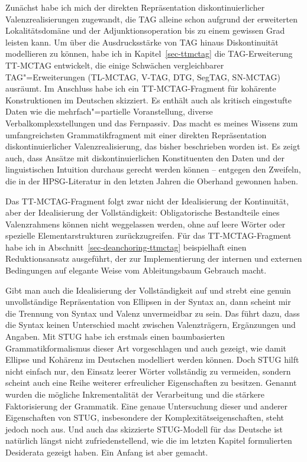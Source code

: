 Zunächst habe ich mich der direkten Repräsentation diskontinuierlicher Valenzrealisierungen zugewandt, die TAG alleine schon aufgrund der erweiterten Lokalitätsdomäne und der Adjunktionsoperation bis zu einem gewissen Grad leisten kann. Um über die Ausdrucksstärke von TAG hinaus Diskontinuität modellieren zu können, habe ich in Kapitel~\ref{sec-ttmctag} die TAG-Erweiterung TT-MCTAG entwickelt, die einige Schwächen vergleichbarer TAG"=Erweiterungen (TL-MCTAG, V-TAG, DTG, SegTAG, SN-MCTAG) ausräumt. Im Anschluss habe ich ein TT-MCTAG-Fragment für kohärente Konstruktionen im Deutschen skizziert. Es enthält auch als kritisch eingestufte Daten wie die mehrfach"=partielle Voranstellung, diverse Verbalkomplexstellungen und das Fernpassiv. Das macht es meines Wissens zum  umfangreichsten Grammatikfragment mit einer direkten Repräsentation diskontinuierlicher Valenzrealisierung, das bisher beschrieben worden ist. Es zeigt auch, dass Ansätze mit diskontinuierlichen Konstituenten den Daten und der linguistischen Intuition durchaus gerecht werden können -- entgegen den Zweifeln, die in der HPSG-Literatur in den letzten Jahren die Oberhand gewonnen haben.

Das TT-MCTAG-Fragment folgt zwar nicht der Idealisierung der Kontinuität, aber der Idealisierung der Vollständigkeit: Obligatorische Bestandteile eines Valenzrahmens können nicht weggelassen werden, ohne auf leere Wörter oder spezielle Elementarstrukturen zurückzugreifen. Für das TT-MCTAG-Fragment habe ich in Abschnitt~\ref{sec-deanchoring-ttmctag} beispielhaft einen Reduktionsansatz ausgeführt, der zur Implementierung der internen und externen Bedingungen auf elegante Weise vom Ableitungsbaum Gebrauch macht. 

Gibt man auch die Idealisierung der Vollständigkeit auf und strebt eine genuin unvollständige Repräsentation von  Ellipsen in der Syntax an, dann scheint mir die Trennung von Syntax und Valenz unvermeidbar zu sein. Das führt dazu, dass die Syntax  keinen Unterschied macht zwischen Valenzträgern, Ergänzungen und Angaben. Mit STUG  habe ich erstmals einen baumbasierten Grammatikformalismus dieser Art vorgeschlagen und auch gezeigt, wie damit Ellipse und Kohärenz im Deutschen modelliert werden können. Doch STUG hilft nicht einfach nur, den Einsatz leerer Wörter vollständig zu vermeiden, sondern scheint auch eine Reihe weiterer erfreulicher Eigenschaften zu besitzen. Genannt wurden die mögliche Inkrementalität der Verarbeitung und die stärkere Faktorisierung der Grammatik. Eine genaue Untersuchung dieser und anderer Eigenschaften von STUG, insbesondere der Komplexitätseigenschaften, steht jedoch noch aus. Und auch das skizzierte STUG-Modell für das Deutsche ist natürlich längst nicht zufriedenstellend, wie die im letzten Kapitel formulierten Desiderata gezeigt haben. Ein Anfang ist aber gemacht.

